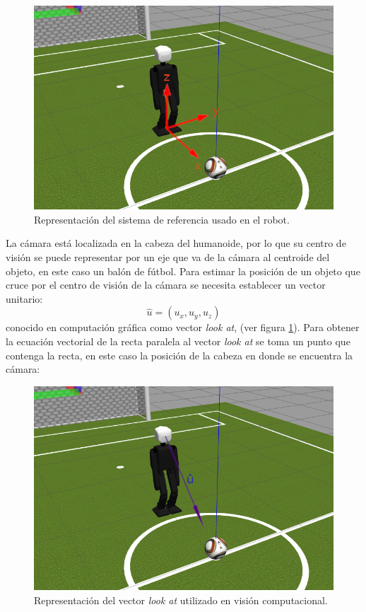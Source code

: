\documentclass{book}
\begin{document}
\begin{figure}
	\centering		
	\includegraphics[scale=2]{images/robot_ejes.png}
	\caption{Representación del sistema de referencia usado en el robot.}		
\end{figure}

La cámara está localizada en la cabeza del humanoide, por lo que su centro
de visión se puede representar por un eje que va de la cámara al centroide del 
objeto, en este caso un balón de fútbol.
Para estimar la posición de un objeto que cruce por el centro de visión de la
cámara se necesita establecer un vector unitario:
\[\hat{u} = (u_x, u_y, u_z)\]
conocido en computación gráfica como vector \textit{look at}, (ver figura \ref{fig:LookAt}). Para obtener la ecuación vectorial de la recta paralela al vector \textit{look at} se toma un punto que contenga la recta, en este caso la posición de la cabeza en donde se encuentra la cámara: 

\begin{figure}
	\centering		
	\includegraphics[scale=2]{images/robot_lookat.png}
	\caption{Representación del vector \textit{look at} utilizado en visión computacional.}		
	\label{fig:LookAt}
\end{figure}
\end{document}
